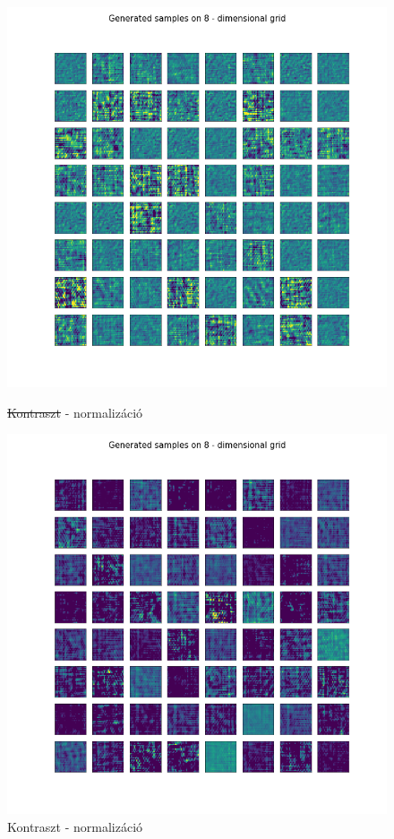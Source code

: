 \documentclass[12pt, english]{article}
\begin{document}
\begin{figure}[H]
\begin{minipage}{0.5\linewidth}
    \centering
    \includegraphics[width=.75\linewidth]{contrast/generated_samples_contrastNorm_noContrast.png} 
    \caption{\st{Kontraszt} - normalizáció} 
    \label{fig:contrast-generated-3} 
  \end{minipage}%
  \begin{minipage}{0.5\linewidth}
    \centering
    \includegraphics[width=.75\linewidth]{contrast/generated_samples_contrastNorm_contrast.png} 
    \caption{Kontraszt - normalizáció} 
    \label{fig:contrast-generated-4} 
  \end{minipage} 
\end{figure}

\vspace{4mm}
\end{document}
